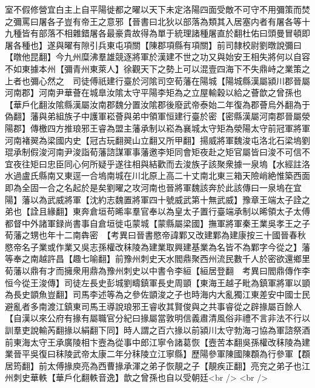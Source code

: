 室不假修營宜白主上自平陽徙都之曜以天下未定洛陽四面受敵不可守不用彌策而焚之彌罵曰屠各子豈有帝王之意邪【晉書曰北狄以部落為類其入居塞内者有屠各等十九種皆有部落不相雜錯屠各最豪貴故得為單于統理諸種屠直於翻杜佑曰頭曼冒頓即屠各種也】遂與曜有隙引兵東屯項關【陳郡項縣有項關】前司隸校尉劉暾說彌曰【暾他昆翻】今九州糜沸羣雄競逐將軍於漢建不世之功又與始安王相失將何以自容不如東據本州【彌青州東萊人】徐觀天下之勢上可以混壹四海下不失鼎峙之業策之上者也彌心然之　司徒傅祇建行臺於河隂司空荀藩在陽城【陽城縣漢屬潁川郡晉屬河南郡】河南尹華薈在城臯汝隂太守平陽李矩為之立屋輸穀以給之薈歆之曾孫也【華戶化翻汝隂縣漢屬汝南郡魏分置汝隂郡後廢武帝泰始二年復為郡薈烏外翻為于偽翻】藩與弟組族子中護軍崧薈與弟中領軍恒建行臺於密【密縣漢屬河南郡晉屬滎陽郡】傳檄四方推琅邪王睿為盟主藩承制以崧為襄城太守矩為滎陽太守前冠軍將軍河南褚翜為梁國内史【冠古玩翻翜山立翻又所甲翻】揚威將軍魏浚屯洛北石梁塢劉琨承制假浚河南尹浚詣荀藩諮謀軍事藩邀李矩同會矩夜赴之矩官屬皆曰浚不可信不宜夜往矩曰忠臣同心何所疑乎遂往相與結歡而去浚族子該聚衆據一泉塢【水經註洛水過盧氏縣南又東逕一合塢南城在川北原上高二十丈南北東三箱天險峭絶惟築西面即為全固一合之名起於是矣劉曜之攻河南也晉將軍魏該奔於此該傳曰一泉塢在宜陽】藩以為武威將軍【沈約志魏置將軍四十號威武第十無武威】豫章王端太子詮之弟也【詮且緣翻】東奔倉垣苟晞率羣官奉以為皇太子置行臺端承制以晞領太子太傅都督中外諸軍録尚書事自倉垣徙屯蒙城【蒙縣屬梁國】撫軍將軍秦王業吳孝王之子荀藩之甥也年十二南犇密　【考異曰晉書愍帝諱鄴又改建鄴為建康按三十國晉春秋愍帝名子業或作業又吳志孫權改秣陵為建業取興建基業為名皆不為鄴字今從之】藩等奉之南越許昌【趣七喻翻】前豫州刺史天水閻鼎聚西州流民數千人於密欲還鄉里荀藩以鼎有才而擁衆用鼎為豫州刺史以中書令李絙【絙居登翻　考異曰閻鼎傳作李恒今從王浚傳】司徒左長史彭城劉疇鎮軍長史周顗【東海王越子毗為鎮軍將軍以顗為長史顗魚豈翻】司馬李述等為之參佐顗浚之子也時海内大亂獨江東差安中國士民避亂者多南渡江鎮東司馬王導說琅邪王睿收其賢俊與之共事睿從之辟掾屬百餘人【自漢以來公府有掾有屬職官分紀曰掾屬當敦明信義肅清風俗非禮不言非法不行以訓羣吏說輸芮翻掾以絹翻下同】時人謂之百六掾以前潁川太守勃海刁協為軍諮祭酒前東海太守王承廣陵相卞壼為從事中郎江寧令諸葛恢【壼苦本翻吳孫權改秣陵為建業晉平吳復曰秣陵武帝太康二年分秣陵立江寧縣】歷陽參軍陳國陳頵為行參軍【頵居筠翻】前太傅掾庾亮為西曹掾承渾之弟子恢靚之子【靚疾正翻】亮兖之弟子也江州刺史華軼【華戶化翻軼音逸】歆之曾孫也自以受朝廷<br />
<br />
